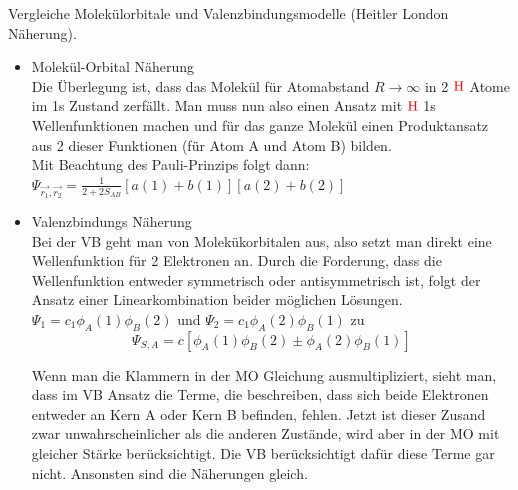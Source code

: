 \documentclass[a5paper,12pt,ngerman,grid=front %
,print
]{kartei}
\let\oldce\ce
\renewcommand*{\ce}[1]{\begingroup\color{red}\oldce{#1}\endgroup}
\begin{document}
		
	\begin{karte}{
		Vergleiche Molekülorbitale und Valenzbindungsmodelle (Heitler London Näherung).
		}
		
		\begin{itemize}
			\item Molekül-Orbital Näherung \\
			
			Die Überlegung ist, dass das Molekül für Atomabstand $R \rightarrow \infty$ in 2 
			$\ce{H}$ Atome im 1s Zustand zerfällt. 
			Man muss nun also einen Ansatz mit $\ce{H}$ 1s Wellenfunktionen machen und für 
			das ganze Molekül einen Produktansatz aus 2 dieser Funktionen 
			(für Atom A und Atom B) bilden. \\
			Mit Beachtung des Pauli-Prinzips folgt dann:
			$\Psi_{\overrightarrow{r_1},\overrightarrow{r_2}} = \frac{1}{2+2S_{AB}}[a(1)+b(1)][a(2)+b(2)]$
			
			\item Valenzbindungs Näherung \\
			 
			 Bei der VB geht man von Molekükorbitalen aus, also setzt man direkt eine Wellenfunktion für 2 Elektronen an. Durch die Forderung, dass die Wellenfunktion entweder symmetrisch oder antisymmetrisch ist, folgt der Ansatz einer Linearkombination beider möglichen Lösungen.
			 $ \Psi_1 = c_1\phi_A(1)\phi_B(2) $ und $ \Psi_2 = c_1\phi_A(2)\phi_B(1) $ zu
			 $$  \Psi_{S,A} = c \left[   \phi_A(1) \phi_B(2) \pm   \phi_A(2) \phi_B(1)   \right]  $$
			 
			 Wenn man die Klammern in der MO Gleichung ausmultipliziert, sieht man, dass im VB Ansatz die Terme, die beschreiben, dass sich beide Elektronen entweder an Kern A oder Kern B befinden, fehlen.
			 Jetzt ist dieser Zusand zwar unwahrscheinlicher als die anderen Zustände, wird aber in der MO mit gleicher Stärke berücksichtigt. Die VB berücksichtigt dafür diese Terme gar nicht.
			 Ansonsten sind die Näherungen gleich.
			
		\end{itemize}
		
	\end{karte}
	
\end{document}
